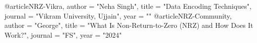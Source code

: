 @article{NRZ-Vikra,
    author = "Neha Singh",
    title = "Data Encoding Techniques",
    journal = "Vikram University, Ujjain",
    year = ""
}
@article{NRZ-Community, 
author = "George", 
title = "What Is Non-Return-to-Zero (NRZ) and How Does It Work?",
journal = "FS",
year = "2024"}